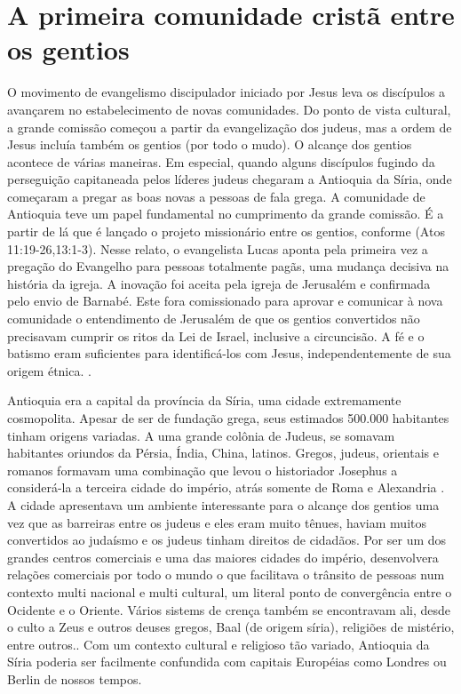 \documentclass[
	12pt,				%
	openright,			%
	twoside,			%
	a4paper,			%
	english,			%
	french,				%
	spanish,			%
	brazil				%
	]{abntex2}
\begin{document}
\section{A primeira comunidade cristã entre os gentios}

O movimento de evangelismo discipulador iniciado por Jesus leva os discípulos a avançarem no estabelecimento de novas comunidades. Do ponto de vista cultural, a grande comissão começou a partir da evangelização dos judeus, mas a ordem de Jesus incluía também os gentios (por todo o mudo). O alcançe dos gentios acontece de várias maneiras. Em especial, quando alguns discípulos fugindo da perseguição capitaneada pelos líderes judeus chegaram a Antioquia da Síria, onde começaram a pregar as boas novas a pessoas de fala grega. A comunidade de Antioquia teve um papel fundamental no cumprimento da grande comissão. É a partir de lá que é lançado o projeto missionário entre os gentios, conforme (Atos 11:19-26,13:1-3). Nesse relato, o evangelista Lucas aponta pela primeira vez a pregação do Evangelho para pessoas totalmente pagãs, uma mudança decisiva na história da igreja. A inovação foi aceita pela igreja de Jerusalém e confirmada pelo envio de Barnabé. Este fora comissionado para aprovar e comunicar à nova comunidade o entendimento de Jerusalém de que os gentios convertidos não precisavam cumprir os ritos da Lei de Israel, inclusive a circuncisão. A fé e o batismo eram suficientes para identificá-los com Jesus, independentemente de sua origem étnica. \cite[198]{green}.

Antioquia era a capital da província da Síria, uma cidade extremamente cosmopolita. Apesar de ser de fundação grega, seus estimados 500.000 habitantes tinham origens variadas. A uma grande colônia de Judeus, se somavam habitantes oriundos da Pérsia, Índia, China, latinos. Gregos, judeus, orientais e romanos formavam uma combinação que levou o historiador Josephus a considerá-la a terceira cidade do império, atrás somente de Roma e Alexandria \cite[185]{stott}. A cidade apresentava um ambiente interessante para o alcançe dos gentios uma vez que as barreiras entre os judeus e eles eram muito tênues, haviam muitos convertidos ao judaísmo e os judeus tinham direitos de cidadãos. Por ser um dos grandes centros comerciais e uma das maiores cidades do império, desenvolvera relações comerciais por todo o mundo o que facilitava o trânsito de pessoas num contexto multi nacional e multi cultural, um literal ponto de convergência entre o Ocidente e o Oriente. Vários sistems de crença também se encontravam ali, desde o culto a Zeus e outros deuses gregos, Baal (de origem síria), religiões de mistério, entre outros.\cite[166,167]{green}. Com um contexto cultural e religioso tão variado, Antioquia da Síria poderia ser facilmente  confundida com capitais Européias como Londres ou Berlin de nossos tempos.
\end{document}
